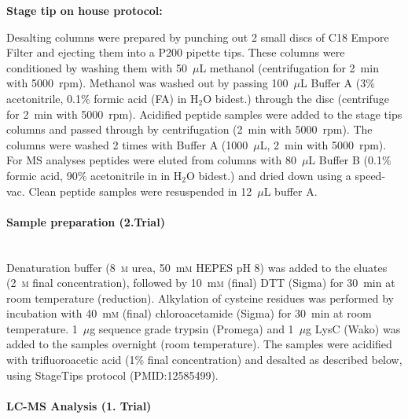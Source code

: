\documentclass[a4paper,11pt,bibtotocnumbered]{article}
\begin{document}
\textbf{Stage tip on house protocol:} 

Desalting columns were prepared by punching out 2 small discs of C18 Empore Filter and ejecting them into a P200 pipette tips. These columns were conditioned by washing them with 50~$\mu$L  methanol (centrifugation for 2~min with 5000~rpm). Methanol was washed out by passing 100~$\mu$L Buffer A (3\% acetonitrile, 0.1\% formic acid (FA) in H$_2$O bidest.) through the disc (centrifuge for 2~min with 5000~rpm). Acidified peptide samples were added to the stage tips columns and passed through by centrifugation (2~min with 5000~rpm). The columns were washed 2 times with Buffer A (1000~$\mu$L, 2~min with 5000~rpm). For MS analyses peptides were eluted from columns with 80~$\mu$L Buffer B (0.1\% formic acid, 90\% acetonitrile in in H$_2$O bidest.) and dried down using a speed-vac. Clean peptide samples were resuspended in 12~$\mu$L buffer A.
 
\paragraph{Sample preparation (2.Trial)} $~$ \\

Denaturation buffer (8~\textsc{m} urea, 50~m\textsc{m} HEPES pH 8) was added to the eluates (2~\textsc{m} final concentration), followed by 10~m\textsc{m} (final) DTT (Sigma) for 30~min at room temperature (reduction). Alkylation of cysteine residues was performed by incubation with 40~m\textsc{m} (final) chloroacetamide (Sigma) for 30~min at room temperature. 1~$\mu$g sequence grade trypsin (Promega) and 1~$\mu$g LysC (Wako) was added to the samples overnight (room temperature). The samples were acidified with trifluoroacetic acid (1\% final concentration) and desalted as described below, using StageTips protocol (PMID:12585499). 

 

\paragraph{LC-MS Analysis (1. Trial)} $~$ \\
\end{document}
